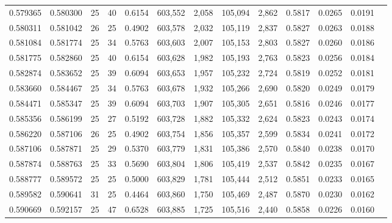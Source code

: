\begin{tabular}{rrrrrrrrrrrrr}
0.579365 & 0.580300 &    25 &  40 &                                     0.6154 & 603,552 &   2,058 & 105,094 &   2,862 & 0.5817 & 0.0265 & 0.0191 \\
0.580311 & 0.581042 &    26 &  25 &                                     0.4902 & 603,578 &   2,032 & 105,119 &   2,837 & 0.5827 & 0.0263 & 0.0188 \\
0.581084 & 0.581774 &    25 &  34 &                                     0.5763 & 603,603 &   2,007 & 105,153 &   2,803 & 0.5827 & 0.0260 & 0.0186 \\
0.581775 & 0.582860 &    25 &  40 &                                     0.6154 & 603,628 &   1,982 & 105,193 &   2,763 & 0.5823 & 0.0256 & 0.0184 \\
0.582874 & 0.583652 &    25 &  39 &                                     0.6094 & 603,653 &   1,957 & 105,232 &   2,724 & 0.5819 & 0.0252 & 0.0181 \\
0.583660 & 0.584467 &    25 &  34 &                                     0.5763 & 603,678 &   1,932 & 105,266 &   2,690 & 0.5820 & 0.0249 & 0.0179 \\
0.584471 & 0.585347 &    25 &  39 &                                     0.6094 & 603,703 &   1,907 & 105,305 &   2,651 & 0.5816 & 0.0246 & 0.0177 \\
0.585356 & 0.586199 &    25 &  27 &                                     0.5192 & 603,728 &   1,882 & 105,332 &   2,624 & 0.5823 & 0.0243 & 0.0174 \\
0.586220 & 0.587106 &    26 &  25 &                                     0.4902 & 603,754 &   1,856 & 105,357 &   2,599 & 0.5834 & 0.0241 & 0.0172 \\
0.587106 & 0.587871 &    25 &  29 &                                     0.5370 & 603,779 &   1,831 & 105,386 &   2,570 & 0.5840 & 0.0238 & 0.0170 \\
0.587874 & 0.588763 &    25 &  33 &                                     0.5690 & 603,804 &   1,806 & 105,419 &   2,537 & 0.5842 & 0.0235 & 0.0167 \\
0.588777 & 0.589572 &    25 &  25 &                                     0.5000 & 603,829 &   1,781 & 105,444 &   2,512 & 0.5851 & 0.0233 & 0.0165 \\
0.589582 & 0.590641 &    31 &  25 &                                     0.4464 & 603,860 &   1,750 & 105,469 &   2,487 & 0.5870 & 0.0230 & 0.0162 \\
0.590669 & 0.592157 &    25 &  47 &                                     0.6528 & 603,885 &   1,725 & 105,516 &   2,440 & 0.5858 & 0.0226 & 0.0160 \\

\end{tabular}

